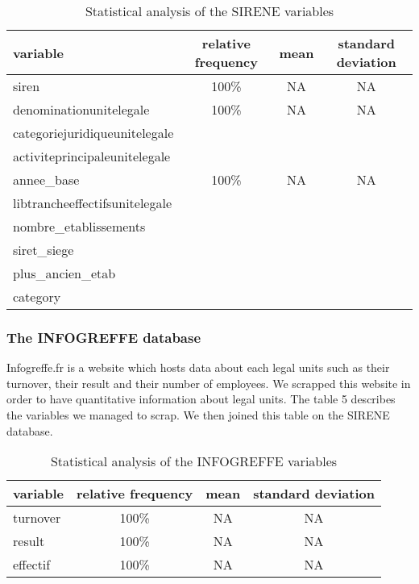 \documentclass[AEJ]{AEA}
\begin{document}
\begin{table}
    \begin{tabular}{l|c|c|c}
        \hline
        variable & relative frequency & mean & standard deviation \\
        \hline
        siren & 100\% & NA & NA \\
        \hline
        denominationunitelegale & 100\% & NA & NA \\
        \hline
        categoriejuridiqueunitelegale  \\
        \hline
        activiteprincipaleunitelegale \\
        \hline
        annee\_base & 100\% & NA & NA \\
        \hline
        libtrancheeffectifsunitelegale \\
        \hline
        nombre\_etablissements \\
        \hline
        siret\_siege \\
        \hline
        plus\_ancien\_etab \\
        \hline
        category \\
        \hline
    \end{tabular}
    \caption{Statistical analysis of the SIRENE variables}
\end{table}
\subsubsection{The INFOGREFFE database}
Infogreffe.fr is a website which hosts data about each legal units such as their turnover, their result
and their number of employees. We scrapped this website in order to have
quantitative information about legal units. The table 5 describes the variables we managed to
scrap. We then joined this table on the SIRENE database.
\begin{table}
    \begin{tabular}{l|c|c|c}
        \hline
        variable & relative frequency & mean & standard deviation \\
        \hline
        turnover & 100\% & NA & NA \\
        \hline
        result & 100\% & NA & NA \\
        \hline
        effectif & 100\% & NA & NA \\
        \hline 
    \end{tabular}
    \caption{Statistical analysis of the INFOGREFFE variables}
\end{table}
\end{document}
